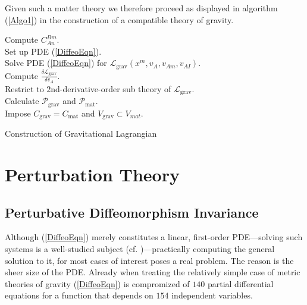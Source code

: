 \documentclass[%
preprint,
titlepage,
nofootinbib,
amsmath,amssymb,
showkeys,
aps,
prd,
floatfix,
]{revtex4-2}
\begin{document}
Given such a matter theory we therefore proceed as displayed in algorithm (\ref{Algo1}) in the construction of a compatible theory of gravity.
\begin{algorithm}[hbt!]
\SetAlgoLined
{}
Compute $C^{Bm}_{An}$. \\
Set up PDE (\ref{DiffeoEqn}). \\
Solve PDE (\ref{DiffeoEqn}) for $\mathcal{L}_{\text{grav}}(x^m,v_A,v_{Am},v_{AI})$.\\
Compute $\frac{\delta \mathcal{L}_{\text{grav}}}{\delta v_A}$.\\
Restrict to $2$nd-derivative-order sub theory of $\mathcal{L}_{\text{grav}}$.\\
Calculate $\mathcal{P}_{\text{grav}}$ and $\mathcal{P}_{\text{mat}}$.\\
Impose $C_{\text{grav}} = C_{\text{mat}}$ and $V_{\text{grav}} \subset V_{mat}.$
 \caption{Construction of Gravitational Lagrangian}\label{Algo1}
\end{algorithm}
\section{Perturbation Theory}\label{chapter2}
\subsection{Perturbative Diffeomorphism Invariance}
Although (\ref{DiffeoEqn}) merely constitutes a linear, first-order PDE---solving such systems is a well-studied subject (cf. \cite{Hilbert})---practically computing the general solution to it, for most cases of interest poses a real problem. The reason is the sheer size of the PDE. Already when treating the relatively simple case of metric theories of gravity (\ref{DiffeoEqn}) is compromized of $140$ partial differential equations for a function that depends on $154$ independent variables.
\end{document}
